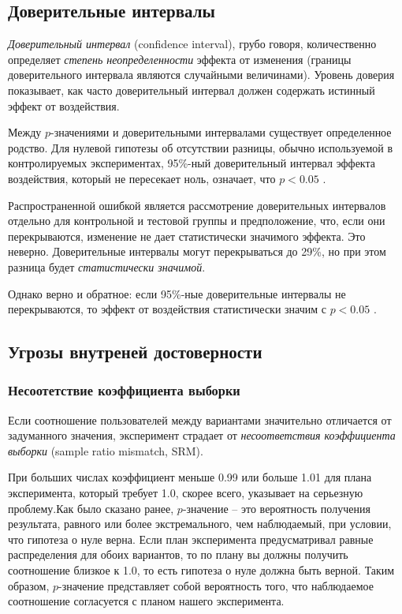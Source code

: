 \documentclass[%
	11pt,
	a4paper,
	utf8,
		]{article}
\begin{document}
\subsection{Доверительные интервалы}

\emph{Доверительный интервал} (confidence interval), грубо говоря, количественно определяет \emph{степень неопределенности} эффекта от изменения (границы доверительного интервала являются случайными величинами). Уровень доверия показывает, как часто доверительный интервал должен содержать истинный эффект от воздействия. 

Между $p$-значениями и доверительными интервалами существует определенное родство. Для нулевой гипотезы об отсутствии разницы, обычно используемой в контролируемых экспериментах, 95\%-ный доверительный интервал эффекта воздействия, который не пересекает ноль, означает, что $p < 0.05$ \cite[]{kohavi:ab-tests-2021}.

Распространенной ошибкой является рассмотрение доверительных интервалов отдельно для контрольной и тестовой группы и предположение, что, если они перекрываются, изменение не дает статистически значимого эффекта. Это неверно. {\color{blue}Доверительные интервалы могут перекрываться до 29\%, но при этом разница будет \emph{статистически значимой}}\cite[]{kohavi:ab-tests-2021}.

Однако верно и обратное: если 95\%-ные доверительные интервалы не перекрываются, то эффект от воздействия статистически значим с $p < 0.05$ \cite[]{kohavi:ab-tests-2021}.

\subsection{Угрозы внутреней достоверности}

\subsubsection{Несоотетствие коэффициента выборки}

Если соотношение пользователей между вариантами значительно отличается от задуманного значения, эксперимент страдает от \emph{несоответствия коэффициента выборки} (sample ratio mismatch, SRM). 

При больших числах коэффициент меньше 0.99 или больше 1.01 для плана эксперимента, который требует 1.0, скорее всего, указывает на серьезную проблему.Как было сказано ранее, $p$-значение -- это вероятность получения результата, равного или более экстремального, чем наблюдаемый, при условии, что гипотеза о нуле верна. Если план эксперимента предусматривал равные распределения для обоих вариантов, то по плану вы должны получить соотношение близкое к 1.0, то есть гипотеза о нуле должна быть верной. Таким образом, $p$-значение представляет собой вероятность того, что наблюдаемое соотношение согласуется с планом нашего эксперимента.
\end{document}
